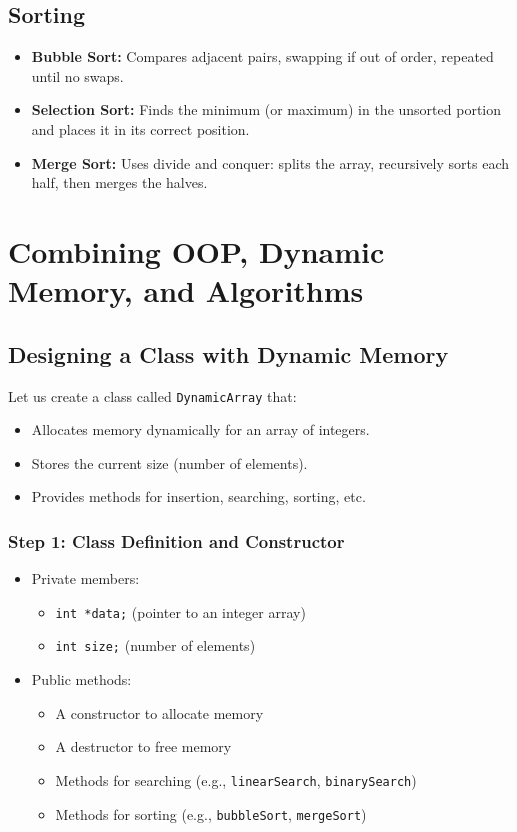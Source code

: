 \documentclass[a4paper,12pt]{article}
\begin{document}
\subsection{Sorting}
\begin{itemize}
    \item \textbf{Bubble Sort:} Compares adjacent pairs, swapping if out of order, repeated until no swaps.
    \item \textbf{Selection Sort:} Finds the minimum (or maximum) in the unsorted portion and places it in its correct position.
    \item \textbf{Merge Sort:} Uses divide and conquer: splits the array, recursively sorts each half, then merges the halves.
\end{itemize}

\section{Combining OOP, Dynamic Memory, and Algorithms}

\subsection{Designing a Class with Dynamic Memory}
Let us create a class called \texttt{DynamicArray} that:
\begin{itemize}
    \item Allocates memory dynamically for an array of integers.
    \item Stores the current size (number of elements).
    \item Provides methods for insertion, searching, sorting, etc.
\end{itemize}

\subsubsection*{Step 1: Class Definition and Constructor}
\begin{itemize}
    \item Private members:
    \begin{itemize}
        \item \texttt{int *data;} (pointer to an integer array)
        \item \texttt{int size;} (number of elements)
    \end{itemize}
    \item Public methods:
    \begin{itemize}
        \item A constructor to allocate memory
        \item A destructor to free memory
        \item Methods for searching (e.g., \texttt{linearSearch}, \texttt{binarySearch})
        \item Methods for sorting (e.g., \texttt{bubbleSort}, \texttt{mergeSort})
    \end{itemize}
\end{itemize}
\end{document}
